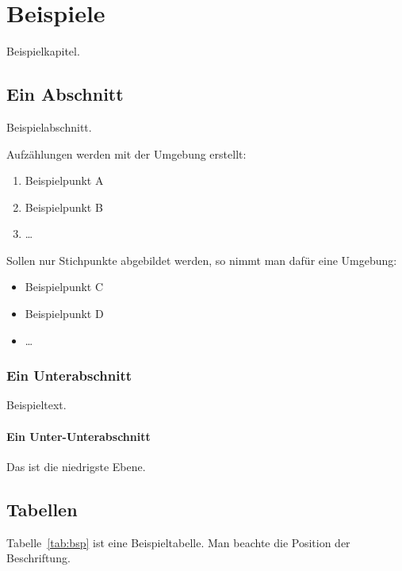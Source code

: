 \chapter{Beispiele}\label{beispiel}

Beispielkapitel.

\section{Ein Abschnitt}
Beispielabschnitt.

Aufzählungen werden mit der  Umgebung erstellt:
\begin{enumerate}
  \item{Beispielpunkt A}
  \item{Beispielpunkt B}
  \item{\ldots}
\end{enumerate}

Sollen nur Stichpunkte abgebildet werden, so nimmt man dafür eine  Umgebung:
\begin{itemize}
  \item{Beispielpunkt C}
  \item{Beispielpunkt D}
  \item{\ldots}
\end{itemize}

\subsection{Ein Unterabschnitt}

Beispieltext.

\subsubsection{Ein Unter-Unterabschnitt}

Das ist die niedrigste Ebene.

\section{Tabellen}

Tabelle~\ref{tab:bsp} ist eine Beispieltabelle.
Man beachte die Position der Beschriftung.


\begin{table}[!htbp]
  \caption{Beispieltabelle}\label{tab:bsp}
\end{table}

